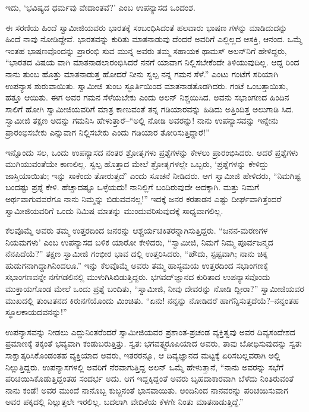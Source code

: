 ಇದು, ‘ಭವಿಷ್ಯದ ಧರ್ಮವು ವೇದಾಂತವೆ?’ ಎಂಬ ಉಪನ್ಯಾಸದ ಒಂದಂಶ.

ಈ ಸರಣಿಯ ಹಿಂದೆ ಸ್ವಾಮೀಜಿಯವರು ಭಾರತಕ್ಕೆ ಸಂಬಂಧಿಸಿದಂತೆ ಹಲವಾರು ಭಾಷಣ ಗಳನ್ನು ಮಾಡಿದುದನ್ನು ಹಿಂದೆ ನಾವು ನೋಡಿದ್ದೇವೆ. ಭಾರತವನ್ನು ಕುರಿತು ಮಾತನಾಡುವು ದೆಂದರೆ ಅವರಿಗೆ ಎಲ್ಲಿಲ್ಲದ ಆಸಕ್ತಿ, ಆನಂದ. ಒಮ್ಮೆ ಇಂತಹ ಭಾಷಣವೊಂದನ್ನು ಪ್ರಾರಂಭಿ ಸುವ ಮುನ್ನ ಅವರು ತಮ್ಮ ಸಹಾಯಕ ಥಾಮಸ್ ಅಲನ್​ನಿಗೆ ಹೇಳಿದ್ದರು, “ಭಾರತದ ವಿಷಯ ವಾಗಿ ಮಾತನಾಡಲಾರಂಭಿಸಿದರೆ ನನಗೆ ಯಾವಾಗ ನಿಲ್ಲಿಸಬೇಕೆಂದೇ ತಿಳಿಯುವುದಿಲ್ಲ. ಆದ್ದ ರಿಂದ ನಾನು ತುಂಬ ಹೊತ್ತು ಮಾತನಾಡುತ್ತ ಹೋದರೆ ನೀನು ಸ್ವಲ್ಪ ನನ್ನ ಗಮನ ಸೆಳೆ.” ಎಂಟು ಗಂಟೆಗೆ ಸರಿಯಾಗಿ ಉಪನ್ಯಾಸ ಶುರುವಾಯಿತು. ಸ್ವಾಮೀಜಿ ತುಂಬ ಸ್ಫೂರ್ತಿಯಿಂದ ಮಾತನಾಡತೊಡಗಿದರು. ಗಂಟೆ ಒಂಬತ್ತಾಯಿತು, ಹತ್ತೂ ಆಯಿತು. ಈಗ ಅವರ ಗಮನ ಸೆಳೆಯಬೇಕು ಎಂದು ಅಲನ್ ನಿಶ್ಚಯಿಸಿದ. ಅವನು ಸಭಾಂಗಣದ ಹಿಂದಿನ ಸಾಲಿಗೆ ಹೋಗಿ ಸ್ವಾಮೀಜಿಯವರಿಗೆ ಮಾತ್ರ ಕಾಣುವಂತೆ ತನ್ನ ಗಡಿಯಾರವನ್ನು ಹಿಡಿದು ಅತ್ತಿಂದಿತ್ತ ಅಲುಗಾಡಿ ಸಿದ. ಸ್ವಾಮೀಜಿ ತಕ್ಷಣ ಅದನ್ನು ಗಮನಿಸಿ ಹೇಳುತ್ತಾರೆ–“ಅಲ್ಲಿ ನೋಡಿ ಅವರನ್ನು! ನಾನು ಉಪನ್ಯಾಸವನ್ನು ಇನ್ನೇನು ಪ್ರಾರಂಭಿಸಬೇಕು ಎನ್ನುವಾಗ ನಿಲ್ಲಿಸಬೇಕು ಎಂದು ಗಡಿಯಾರ ತೋರಿಸುತ್ತಿದ್ದಾರೆ!”

ಇನ್ನೊಂದು ಸಲ, ಒಂದು ಉಪನ್ಯಾಸದ ನಂತರ ಶ್ರೋತೃಗಳು ಪ್ರಶ್ನೆಗಳನ್ನು ಕೇಳಲು ಪ್ರಾರಂಭಿಸಿದರು. ಆದರೆ ಪ್ರಶ್ನೆಗಳು ಮುಗಿಯುವಂತೆಯೇ ಕಾಣಲಿಲ್ಲ. ಸ್ವಲ್ಪ ಹೊತ್ತಾದ ಮೇಲೆ ಶ್ರೋತೃಗಳಲ್ಲೇ ಒಬ್ಬರು, ‘ಪ್ರಶ್ನೆಗಳನ್ನು ಕೇಳಿದ್ದು ಜಾಸ್ತಿಯಾಯಿತು; ಇನ್ನು ಸಾಕೆಂದು ತೋರುತ್ತದೆ’ ಎಂದು ಸೂಚನೆ ನೀಡಿದರು. ಆಗ ಸ್ವಾಮೀಜಿ ಹೇಳಿದರು, “ನಿಮಗಿಷ್ಟ ಬಂದಷ್ಟು ಪ್ರಶ್ನೆ ಕೇಳಿ. ಹೆಚ್ಚಾದಷ್ಟೂ ಒಳ್ಳೆಯದು! ನಾನಿಲ್ಲಿಗೆ ಬಂದಿರುವುದೇ ಅದಕ್ಕಾಗಿ. ಮತ್ತು ನಿಮಗೆ ಅರ್ಥವಾಗುವವರೆಗೂ ನಾನು ನಿಮ್ಮನ್ನು ಬಿಡುವವನಲ್ಲ!” ಇದಕ್ಕೆ ಜನರ ಕರತಾಡನ ಎಷ್ಟು ದೀರ್ಘವಾಗಿತ್ತೆಂದರೆ ಸ್ವಾಮೀಜಿಯವರಿಗೆ ಒಂದು ನಿಮಿಷ ಮಾತನ್ನು ಮುಂದುವರಿಸುವುದಕ್ಕೆ ಸಾಧ್ಯವಾಗಲಿಲ್ಲ.

ಕೆಲವೊಮ್ಮೆ ಅವರು ತಮ್ಮ ಉತ್ತರದಿಂದ ಜನರನ್ನು ಆಶ್ಚರ್ಯಚಕಿತರನ್ನಾಗಿಸುತ್ತಿದ್ದರು. “ಜನನ-ಮರಣಗಳ ನಿಯಮಗಳು’ ಎಂಬ ಉಪನ್ಯಾಸದ ಬಳಿಕ ಯಾರೋ ಕೇಳಿದರು, “ಸ್ವಾಮೀಜಿ, ನಿಮಗೆ ನಿಮ್ಮ ಪೂರ್ವಜನ್ಮದ ನೆನಪಿದೆಯೆ?” ತಕ್ಷಣ ಸ್ವಾಮೀಜಿ ಗಂಭೀರ ಭಾವ ದಲ್ಲಿ ಉತ್ತರಿಸಿದರು, “ಹೌದು, ಸ್ಪಷ್ಟವಾಗಿ; ನಾನು ಚಿಕ್ಕ ಹುಡುಗನಾಗಿದ್ದಾಗಿನಿಂದಲೂ.” ಇನ್ನು ಕೆಲವೊಮ್ಮೆ ಅವರು ತಮ್ಮ ಹಾಸ್ಯಮಯ ಉತ್ತರದಿಂದ ಸಭಾಂಗಣಕ್ಕೆ ಸಭಾಂಗಣವನ್ನೇ ನಗೆಗಡಲಿನಲ್ಲಿ ಮುಳುಗಿಸಿಬಿಡುತ್ತಿದ್ದರು. ಭಗವದ್​ಜ್ಞಾನದ ಕುರಿತಾದ ಉಪನ್ಯಾಸವೊಂದು ಮುಕ್ತಾಯಗೊಂಡ ಮೇಲೆ ಒಂದು ಪ್ರಶ್ನೆ ಬಂದಿತು, “ಸ್ವಾಮೀಜಿ, ನೀವು ದೇವರನ್ನು ನೋಡಿ ದ್ದೀರಾ?” ಸ್ವಾಮೀಜಿಯವರ ಮುಖದಲ್ಲಿ ತುಂಟತನದ ಕಿರುನಗೆಯೊಂದು ಮಿಂಚಿತು. “ಏನು! ನನ್ನನ್ನು ನೋಡಿದರೆ ಹಾಗೆನ್ನಿಸುತ್ತದೆಯೆ?–ನನ್ನಂತಹ ಸ್ಥೂಲಕಾಯದವನನ್ನು!”

ಉಪನ್ಯಾಸವನ್ನು ನೀಡಲು ಎದ್ದುನಿಂತರೆಂದರೆ ಸ್ವಾಮೀಜಿಯವರ ಪ್ರಶಾಂತ-ಪ್ರಚಂಡ ವ್ಯಕ್ತಿತ್ವವು ಅವರ ದಿವ್ಯಸಂದೇಶದ ಪ್ರಮಾಣಕ್ಕೆ ತಕ್ಕಂತೆ ಭವ್ಯವಾಗಿ ಕಂಡುಬರುತ್ತಿತ್ತು. ಸ್ವತಃ ಭಗವತ್ಸ್ವರೂಪಿಯಾದ ಅವರು, ತಾವು ಬೋಧಿಸುವುದನ್ನು ಸ್ವತಃ ಸಾಕ್ಷಾತ್ಕರಿಸಿಕೊಂಡಂತಹ ವ್ಯಕ್ತಿಯಾದ ಅವರು, ಇತರರನ್ನೂ, ಆ ದಿವ್ಯಜ್ಞಾನದ ಮಟ್ಟಕ್ಕೆ ಏರಿಸಬಲ್ಲವರಾಗಿ ಅಲ್ಲಿ ನಿಲ್ಲುತ್ತಿದ್ದರು. ಉಪನ್ಯಾಸಗಳಲ್ಲಿ ಅವರಿಗೆ ನೆರವಾಗುತ್ತಿದ್ದ ಅಲನ್ ಒಮ್ಮೆ ಹೇಳುತ್ತಾನೆ, “ನಾನು ಅವರನ್ನು ಸಭೆಗೆ ಪರಿಚಯಿಸಿಕೊಡುತ್ತಿದ್ದಂತಹ ಸಂದರ್ಭ ಅದು. ಆಗ ಇದ್ದಕ್ಕಿದ್ದಂತೆ ಅವರು ಬೃಹದಾಕಾರವಾಗಿ ಬೆಳೆದು ನಿಂತಿರುವಂತೆ ನಾನು ಕಂಡೆ! ಅವರ ಮುಂದೆ ನಾನೊಬ್ಬ ಕುಬ್ಜನಂತೆ ಭಾಸವಾಯಿತು. ಅಂದಿನಿಂದ ನಾನವರನ್ನು ಪರಿಚಯಿಸುವಾಗ ಅವರ ಪಕ್ಕದಲ್ಲಿ ನಿಲ್ಲುತ್ತಲೇ ಇರಲಿಲ್ಲ. ಬದಲಾಗಿ ವೇದಿಕೆಯ ಕೆಳಗೇ ನಿಂತು ಮಾತನಾಡುತ್ತಿದ್ದೆ.”


